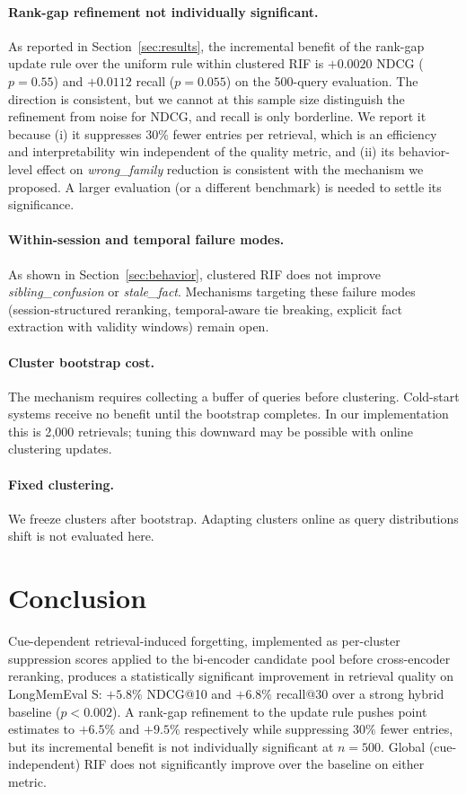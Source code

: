 \documentclass[11pt,a4paper]{article}
\begin{document}
\paragraph{Rank-gap refinement not individually significant.} As reported in Section~\ref{sec:results}, the incremental benefit of the rank-gap update rule over the uniform rule within clustered RIF is $+0.0020$ NDCG ($p=0.55$) and $+0.0112$ recall ($p=0.055$) on the 500-query evaluation. The direction is consistent, but we cannot at this sample size distinguish the refinement from noise for NDCG, and recall is only borderline. We report it because (i) it suppresses $30\%$ fewer entries per retrieval, which is an efficiency and interpretability win independent of the quality metric, and (ii) its behavior-level effect on \emph{wrong\_family} reduction is consistent with the mechanism we proposed. A larger evaluation (or a different benchmark) is needed to settle its significance.

\paragraph{Within-session and temporal failure modes.} As shown in Section~\ref{sec:behavior}, clustered RIF does not improve \emph{sibling\_confusion} or \emph{stale\_fact}. Mechanisms targeting these failure modes (session-structured reranking, temporal-aware tie breaking, explicit fact extraction with validity windows) remain open.

\paragraph{Cluster bootstrap cost.} The mechanism requires collecting a buffer of queries before clustering. Cold-start systems receive no benefit until the bootstrap completes. In our implementation this is 2{,}000 retrievals; tuning this downward may be possible with online clustering updates.

\paragraph{Fixed clustering.} We freeze clusters after bootstrap. Adapting clusters online as query distributions shift is not evaluated here.

\section{Conclusion}

Cue-dependent retrieval-induced forgetting, implemented as per-cluster suppression scores applied to the bi-encoder candidate pool before cross-encoder reranking, produces a statistically significant improvement in retrieval quality on LongMemEval S: $+5.8\%$ NDCG@10 and $+6.8\%$ recall@30 over a strong hybrid baseline ($p < 0.002$). A rank-gap refinement to the update rule pushes point estimates to $+6.5\%$ and $+9.5\%$ respectively while suppressing $30\%$ fewer entries, but its incremental benefit is not individually significant at $n=500$. Global (cue-independent) RIF does not significantly improve over the baseline on either metric.
\end{document}
